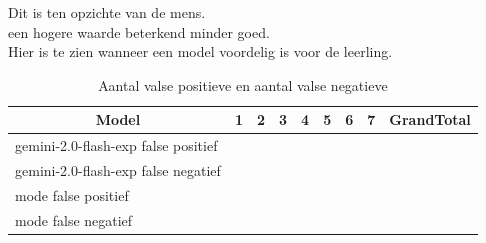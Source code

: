\documentclass[12pt]{article}
\begin{document}
\noindent\begin{table}[H]
\caption{Aantal valse positieve en aantal valse negatieve}

\label{fig:false-pos-neg}

Dit is ten opzichte van de mens.\\
een hogere waarde beterkend minder goed. \\
Hier is te zien wanneer een model voordelig is voor de leerling.
\begin{tabularx}{\textwidth}{p{4cm} XXXXXXXX}
    \toprule
    \multicolumn{1}{c}{\textbf{Model}} & \multicolumn{1}{c}{\textbf{1}} & \multicolumn{1}{c}{\textbf{2}} & \multicolumn{1}{c}{\textbf{3}} & \multicolumn{1}{c}{\textbf{4}} & \multicolumn{1}{c}{\textbf{5}} & \multicolumn{1}{c}{\textbf{6}} & \multicolumn{1}{c}{\textbf{7}} & \multicolumn{1}{c}{\textbf{GrandTotal}} \\
    \midrule
    gemini-2.0-flash-exp false positief & \cellcolor[rgb]{1.000,1.000,1.000}{0} & \cellcolor[rgb]{0.909,0.939,0.909}{2} & \cellcolor[rgb]{0.592,0.726,0.592}{9} & \cellcolor[rgb]{0.909,0.939,0.909}{2} & \cellcolor[rgb]{0.909,0.939,0.909}{2} & \cellcolor[rgb]{1.000,1.000,1.000}{0} & \cellcolor[rgb]{1.000,1.000,1.000}{0} & \cellcolor[rgb]{0.320,0.544,0.320}{15} \\
    gemini-2.0-flash-exp false negatief & \cellcolor[rgb]{1.000,1.000,1.000}{0} & \cellcolor[rgb]{1.000,1.000,1.000}{0} & \cellcolor[rgb]{1.000,1.000,1.000}{0} & \cellcolor[rgb]{0.864,0.909,0.864}{3} & \cellcolor[rgb]{0.955,0.970,0.955}{1} & \cellcolor[rgb]{0.909,0.939,0.909}{2} & \cellcolor[rgb]{0.819,0.878,0.819}{4} & \cellcolor[rgb]{0.547,0.696,0.547}{10} \\
    mode false positief & \cellcolor[rgb]{1.000,1.000,1.000}{0} & \cellcolor[rgb]{1.000,1.000,1.000}{0} & \cellcolor[rgb]{0.909,0.939,0.909}{2} & \cellcolor[rgb]{0.909,0.939,0.909}{2} & \cellcolor[rgb]{0.909,0.939,0.909}{2} & \cellcolor[rgb]{1.000,1.000,1.000}{0} & \cellcolor[rgb]{0.909,0.939,0.909}{2} & \cellcolor[rgb]{0.637,0.757,0.637}{8} \\
    mode false negatief & \cellcolor[rgb]{0.955,0.970,0.955}{1} & \cellcolor[rgb]{1.000,1.000,1.000}{0} & \cellcolor[rgb]{1.000,1.000,1.000}{0} & \cellcolor[rgb]{0.728,0.818,0.728}{6} & \cellcolor[rgb]{0.909,0.939,0.909}{2} & \cellcolor[rgb]{0.864,0.909,0.864}{3} & \cellcolor[rgb]{0.819,0.878,0.819}{4} & \cellcolor[rgb]{0.275,0.514,0.275}{16} \\
    \bottomrule
\end{tabularx}
\end{table}
\end{document}
